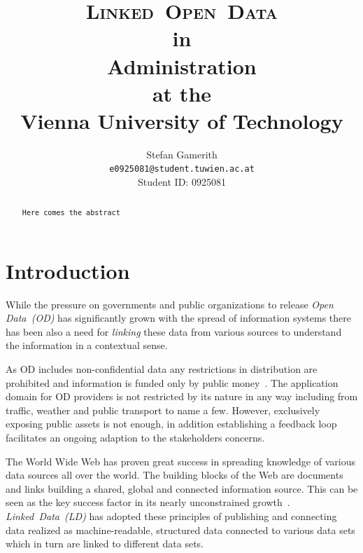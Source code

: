 \documentclass{article}
\begin{document}
\renewcommand{\bibname}{References}

\pagestyle{plain}

\title{\textsc{\textbf{L}inked~\textbf{O}pen~\textbf{D}ata}\\in\\Administration\\at the\\Vienna University of Technology}
\date{}
\author{Stefan Gamerith\\
\texttt{e0925081@student.tuwien.ac.at} \\ Student ID: 0925081}

\maketitle
\thispagestyle{empty}

\begin{abstract}
	\texttt{Here comes the abstract}
\end{abstract}

\newpage
\tableofcontents
\thispagestyle{empty}

\newpage
{}

\section{Introduction}
While the pressure on governments and public organizations to release \textit{Open Data~(OD)} has significantly grown with the spread of information systems there has been also a need for \textit{linking} these data from various sources to understand the information in a contextual sense.

As OD includes non-confidential data any restrictions in distribution are prohibited and information is funded only by public money~\cite{article:janssen2012benefits}. The application domain for OD providers is not restricted by its nature in any way including from traffic, weather and public transport to name a few. However, exclusively exposing public assets is not enough, in addition establishing a feedback loop facilitates an ongoing adaption to the stakeholders concerns. 

The World Wide Web has proven great success in spreading knowledge of various data sources all over the world. The building blocks of the Web are documents and links building a shared, global and connected information source. This can be seen as the key success factor in its nearly unconstrained growth~\cite{report:jacobs-i-2004--a}. 
\textit{Linked~Data~(LD)} has adopted these principles of publishing and connecting data realized as machine-readable, structured data connected to various data sets which in turn are linked to different data sets. 
\end{document}
